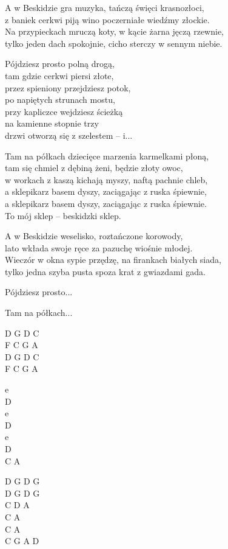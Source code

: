 \begin{text}
    A w Beskidzie gra muzyka, tańczą święci krasnozłoci,\\
    z baniek cerkwi piją wino poczerniałe wiedźmy złockie.\\
    Na przypieckach mruczą koty, w kącie żarna jęczą rzewnie,\\
    tylko jeden dach spokojnie, cicho sterczy w sennym niebie.

    \vin Pójdziesz prosto polną drogą,\\
    \vin tam gdzie cerkwi piersi złote,\\
    \vin przez spieniony przejdziesz potok,\\
    \vin po napiętych strunach mostu,\\
    \vin przy kapliczce wejdziesz ścieżką\\
    \vin na kamienne stopnie trzy\\
    \vin drzwi otworzą się z szelestem – i...

    \vin Tam na półkach dziecięce marzenia karmelkami płoną,\\
    \vin tam się chmiel z dębiną żeni, będzie złoty owoc,\\
    \vin w workach z kaszą kichają myszy, naftą pachnie chleb,\\
    \vin a sklepikarz basem dyszy, zaciągając z ruska śpiewnie,\\    
    \vin a sklepikarz basem dyszy, zaciągając z ruska śpiewnie.\\
    \vin To mój sklep – beskidzki sklep.

    A w Beskidzie weselisko, roztańczone korowody,\\
    lato wkłada swoje ręce za pazuchę wiośnie młodej.\\
    Wieczór w okna sypie przędzę, na firankach białych siada,\\
    tylko jedna szyba pusta spoza krat z gwiazdami gada.

    \vin Pójdziesz prosto...

    \vin Tam na półkach...
\end{text}
\begin{chord}
    D G D C\\
    F C G A\\
    D G D C\\
    F C G A

    e\\
    D\\
    e\\
    D\\
    e\\
    D\\
    C A

    D G D G\\
    D G D G\\
    C D A\\
    C A\\    
    C A\\
    C G A D
\end{chord}